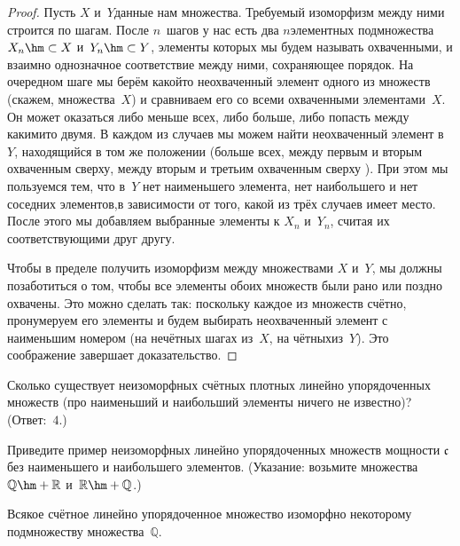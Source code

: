 \begin{proof}
Пусть $X$ и~$Y$\т данные нам множества. Требуемый изоморфизм
между ними строится по шагам. После $n$~шагов у нас есть два
$n$\д элементных подмножества $X_n\hm\subset X$ и~$Y_n\hm\subset Y$,
элементы которых мы будем называть  охваченными, и
взаимно однозначное соответствие между ними, сохраняющее
порядок. На очередном шаге мы берём какой\д то неохваченный
элемент одного из
множеств (скажем, множества~$X$) и сравниваем его со всеми охваченными
элементами~$X$. Он может оказаться либо меньше всех,
либо больше, либо попасть между какими\д то двумя. В
каждом из случаев мы можем найти неохваченный элемент в~$Y$,
находящийся в том же положении (больше всех,
между первым и вторым
охваченным сверху,
между вторым и третьим
охваченным сверху ).
При этом мы пользуемся тем, что
в~$Y$ нет наименьшего элемента, нет наибольшего и нет соседних
элементов,\т в зависимости от того, какой из трёх случаев имеет
место. После этого мы добавляем выбранные элементы к $X_n$ и~$Y_n$,
считая их соответствующими друг другу.

Чтобы в пределе
получить изоморфизм между множествами $X$ и~$Y$, мы должны
позаботиться о том, чтобы все элементы обоих множеств были рано
или поздно охвачены. Это можно сделать так: поскольку каждое
из множеств счётно, пронумеруем его элементы и будем выбирать
неохваченный элемент с наименьшим номером (на нечётных шагах\т
из~$X$, на чётных\т из~$Y$). Это соображение завершает
доказательство.
\end{proof}

\begin{problem}
Сколько существует неизоморфных счёт\-ных плотных
линейно упорядоченных множеств (про наименьший и наибольший
элементы ничего не известно)? (Ответ:~$4$.)
\end{problem}

\begin{problem}
Приведите пример неизоморфных линейно упорядоченных множеств
мощности $\mathfrak{c}$ без наименьшего и наибольшего элементов.
(Указание: возьмите множества $\mathbb{Q}\hm+\mathbb{R}$
и~$\mathbb{R}\hm+\mathbb{Q}$.)
\end{problem}

\begin{theorem}
        \label{Q-universal}
Всякое счётное линейно упорядоченное множество
изоморфно некоторому подмножеству множества~$\mathbb{Q}$.
\end{theorem}

